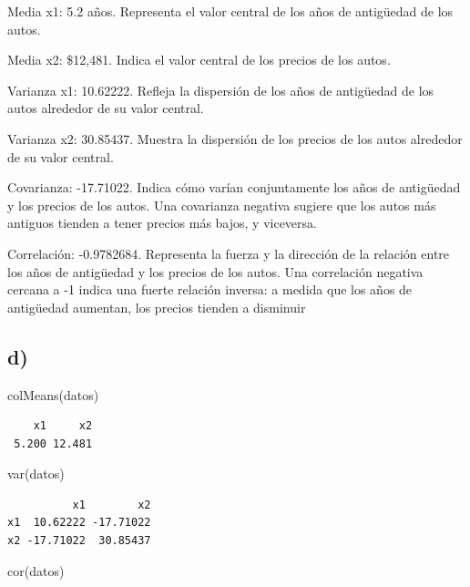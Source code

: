 \documentclass[
]{article}
\newenvironment{Shaded}{\begin{snugshade}}{\end{snugshade}}
\newcommand{\FunctionTok}[1]{\textcolor[rgb]{0.00,0.00,0.00}{#1}}
\newcommand{\NormalTok}[1]{#1}
\begin{document}
Media x1: 5.2 años. Representa el valor central de los años de
antigüedad de los autos.

Media x2: \$12,481. Indica el valor central de los precios de los autos.

Varianza x1: 10.62222. Refleja la dispersión de los años de antigüedad
de los autos alrededor de su valor central.

Varianza x2: 30.85437. Muestra la dispersión de los precios de los autos
alrededor de su valor central.

Covarianza: -17.71022. Indica cómo varían conjuntamente los años de
antigüedad y los precios de los autos. Una covarianza negativa sugiere
que los autos más antiguos tienden a tener precios más bajos, y
viceversa.

Correlación: -0.9782684. Representa la fuerza y la dirección de la
relación entre los años de antigüedad y los precios de los autos. Una
correlación negativa cercana a -1 indica una fuerte relación inversa: a
medida que los años de antigüedad aumentan, los precios tienden a
disminuir

\hypertarget{d}{%
\subsection{d)}\label{d}}

\begin{Shaded}
\begin{Highlighting}[]
\FunctionTok{colMeans}\NormalTok{(datos)}
\end{Highlighting}
\end{Shaded}

\begin{verbatim}
    x1     x2 
 5.200 12.481 
\end{verbatim}

\begin{Shaded}
\begin{Highlighting}[]
\FunctionTok{var}\NormalTok{(datos)}
\end{Highlighting}
\end{Shaded}

\begin{verbatim}
          x1        x2
x1  10.62222 -17.71022
x2 -17.71022  30.85437
\end{verbatim}

\begin{Shaded}
\begin{Highlighting}[]
\FunctionTok{cor}\NormalTok{(datos)}
\end{Highlighting}
\end{Shaded}
\end{document}
